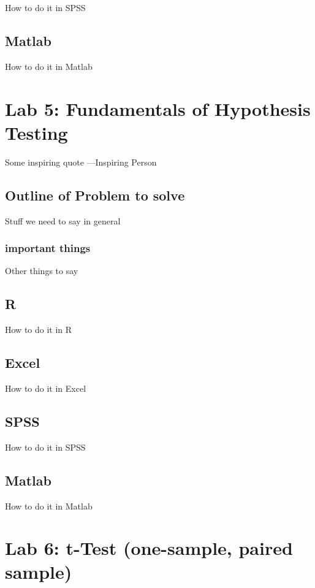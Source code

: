 \documentclass[]{book}
\theoremstyle{definition}
\theoremstyle{definition}
\theoremstyle{definition}
\theoremstyle{remark}
\begin{document}
How to do it in SPSS

\section{Matlab}\label{matlab-3}

How to do it in Matlab

\chapter{Lab 5: Fundamentals of Hypothesis
Testing}\label{lab-5-fundamentals-of-hypothesis-testing}

{ Some inspiring quote ---Inspiring Person }

\section{Outline of Problem to
solve}\label{outline-of-problem-to-solve-3}

Stuff we need to say in general

\subsection{important things}\label{important-things-3}

Other things to say

\section{R}\label{r-5}

How to do it in R

\section{Excel}\label{excel-4}

How to do it in Excel

\section{SPSS}\label{spss-4}

How to do it in SPSS

\section{Matlab}\label{matlab-4}

How to do it in Matlab

\chapter{Lab 6: t-Test (one-sample, paired
sample)}\label{lab-6-t-test-one-sample-paired-sample}
\end{document}
